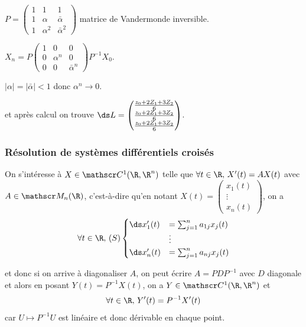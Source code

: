 \begin{exemple}
    $P = \begin{pmatrix}
        1 & 1 & 1 \\
        1 & \alpha & \bar \alpha \\
        1 & \alpha^2 & \bar \alpha^2
    \end{pmatrix}
    $ matrice de Vandermonde inversible.

    $X_n = P \begin{pmatrix}
        1 & 0 & 0 \\
        0 & \alpha^n & 0 \\
        0 & 0 & \bar \alpha^n
    \end{pmatrix} P^{-1} X_0$.

    $|\alpha| = |\bar \alpha| < 1$ donc $\alpha^n \to 0$.

    et après calcul on trouve $\ds L = \begin{pmatrix}
        \frac{z_0 + 2 Z_1 + 3 Z_2}{6} \\
        \frac{z_0 + 2 Z_1 + 3 Z_2}{6} \\
        \frac{z_0 + 2 Z_1 + 3 Z_2}{6}
    \end{pmatrix}$.
\end{exemple}

\subsubsection{Résolution de systèmes différentiels croisés }

On s'intéresse à $X \in \mathscr C^1(\R, \R^n)$ telle que $\forall t \in \R, \, X'(t) = A X(t)$ 
avec $A \in \mathscr M_n(\R)$, c'est-à-dire qu'en notant $X(t) = \begin{pmatrix}
x_1(t) \\
\vdots \\
x_n(t)
\end{pmatrix}$, on a $$\forall t \in \R, \,(S) \begin{cases}
\ds x_1'(t) & = \sum_{j = 1 }^{n } a_{1j} x_j(t) \\
& \vdots \\
\ds x_n'(t) & = \sum_{j = 1 }^{ n } a_{nj} x_j(t)
\end{cases}$$

et donc si on arrive à diagonaliser $A$, on peut écrire $A = PDP^{-1}$ avec $D$ diagonale
et alors en posant $Y(t) = P^{-1} X(t)$, on a $Y \in \mathscr C^1(\R, \R^n)$ et
$$\forall t \in \R, \, Y'(t) = P^{-1} X'(t) $$ car $U \mapsto P^{-1} U$ est linéaire et donc dérivable en chaque point.

